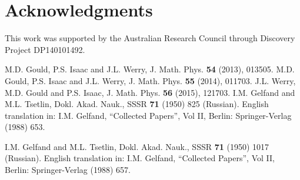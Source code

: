 \documentclass[12pt]{article}
\begin{document}
%
%
%
\section*{Acknowledgments}
%
This work was supported by the Australian Research Council through Discovery Project
DP140101492. 
%
%
%
%
%

\begin{thebibliography}{10}

%
%
% 
 M.D. Gould, P.S. Isaac and J.L. Werry, J. Math. Phys. {\bf 54} (2013), 013505.
% 
 M.D. Gould, P.S. Isaac and J.L. Werry, J. Math. Phys. {\bf 55} (2014), 011703.
%
 J.L. Werry, M.D. Gould and P.S. Isaac, J. Math. Phys. {\bf 56} (2015), 121703.
% 
%  
%
% 
%  
%  
I.M. Gelfand and M.L. Tsetlin, Dokl. Akad. Nauk., SSSR {\bf 71} (1950) 825 (Russian).
English translation in: I.M. Gelfand, ``Collected Papers'', Vol II, Berlin:
Springer-Verlag (1988) 653.
  
I.M. Gelfand and M.L. Tsetlin, Dokl. Akad. Nauk., SSSR {\bf 71} (1950) 1017 (Russian).
English translation in: I.M. Gelfand, ``Collected Papers'', Vol II, Berlin:
Springer-Verlag (1988) 657.
  

\end{thebibliography}
\end{document}
